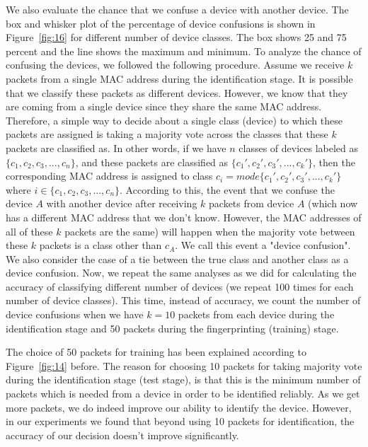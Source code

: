 We also evaluate the chance that we confuse a device with another device.  The
box and whisker plot of the percentage of device confusions is shown in
Figure~\ref{fig:16} for different number of device classes. The box shows 25
and 75 percent and the line shows the maximum and minimum.  To analyze the chance of confusing the devices, we followed the following procedure. Assume we receive
$k$ packets from a single MAC address during the identification stage. It is
possible that we classify these packets as different devices. However, we know
that they are coming from a single device since they share the same MAC address.
Therefore, a simple way to decide about a single class (device) to which these
packets are assigned is taking a majority vote across the classes that these
$k$ packets are classified as. In other words, if we have $n$ classes of
devices labeled as $\{c_1,c_2,c_3,...,c_n\}$, and these packets are classified
as $\{c_1',c_2',c_3',...,c_k'\}$, then the corresponding MAC address is
assigned to class $c_i = mode \{c_1',c_2',c_3',...,c_k'\}$ where $i \in
\{c_1,c_2,c_3,...,c_n\}$. According to this, the event that we confuse the
device $A$ with another device after receiving $k$ packets from device $A$
(which now has a different MAC address that we don't know. However, the MAC
addresses of all of these $k$ packets are the same) will happen when the
majority vote between these $k$ packets is a class other than $c_A$. We call
this event a "device confusion". We also consider  the case of a tie between
the true class and another class as a device confusion. Now, we repeat the same
analyses as we did for calculating the accuracy of classifying different number
of devices (we repeat 100 times for each number of device classes). This time,
instead of accuracy, we count the number of device confusions when we have
$k=10$ packets from each device during the identification stage and 50 packets
during the fingerprinting (training) stage. 

The choice of 50 packets for training has been explained according to Figure~\ref{fig:14} before. The reason for choosing 10 packets for taking majority vote during the identification stage (test stage), is that this is the minimum number of packets which is needed from a device in order to be identified reliably. As we get more packets, we do indeed improve our ability to identify the device. However, in our experiments we found that beyond using 10 packets for identification, the accuracy of our decision doesn’t improve significantly.




